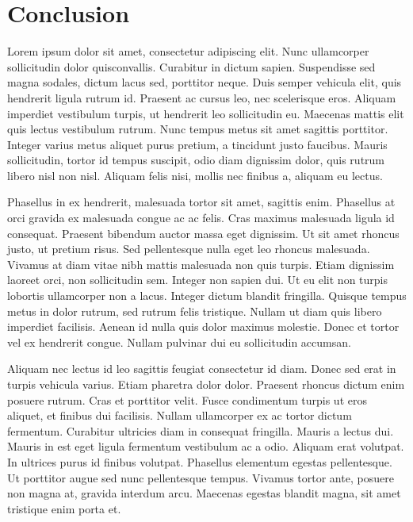 \chapter{Conclusion}

Lorem ipsum dolor sit amet, consectetur adipiscing elit. Nunc ullamcorper
sollicitudin dolor quisconvallis. Curabitur in dictum sapien. Suspendisse sed
magna sodales, dictum lacus sed, porttitor neque. Duis semper vehicula elit,
quis hendrerit ligula rutrum id. Praesent ac cursus leo, nec scelerisque eros.
Aliquam imperdiet vestibulum turpis, ut hendrerit leo sollicitudin eu. Maecenas
mattis elit quis lectus vestibulum rutrum. Nunc tempus metus sit amet sagittis
porttitor. Integer varius metus aliquet purus pretium, a tincidunt justo
faucibus. Mauris sollicitudin, tortor id tempus suscipit, odio diam dignissim
dolor, quis rutrum libero nisl non nisl. Aliquam felis nisi, mollis nec finibus
a, aliquam eu lectus.

Phasellus in ex hendrerit, malesuada tortor sit amet, sagittis enim. Phasellus
at orci gravida ex malesuada congue ac ac felis. Cras maximus malesuada ligula
id consequat. Praesent bibendum auctor massa eget dignissim. Ut sit amet rhoncus
justo, ut pretium risus. Sed pellentesque nulla eget leo rhoncus malesuada.
Vivamus at diam vitae nibh mattis malesuada non quis turpis. Etiam dignissim
laoreet orci, non sollicitudin sem. Integer non sapien dui. Ut eu elit non
turpis lobortis ullamcorper non a lacus. Integer dictum blandit fringilla.
Quisque tempus metus in dolor rutrum, sed rutrum felis tristique. Nullam ut diam
quis libero imperdiet facilisis. Aenean id nulla quis dolor maximus molestie.
Donec et tortor vel ex hendrerit congue. Nullam pulvinar dui eu sollicitudin
accumsan.

Aliquam nec lectus id leo sagittis feugiat consectetur id diam. Donec sed erat
in turpis vehicula varius. Etiam pharetra dolor dolor. Praesent rhoncus dictum
enim posuere rutrum. Cras et porttitor velit. Fusce condimentum turpis ut eros
aliquet, et finibus dui facilisis. Nullam ullamcorper ex ac tortor dictum
fermentum. Curabitur ultricies diam in consequat fringilla. Mauris a lectus dui.
Mauris in est eget ligula fermentum vestibulum ac a odio. Aliquam erat volutpat.
In ultrices purus id finibus volutpat. Phasellus elementum egestas pellentesque.
Ut porttitor augue sed nunc pellentesque tempus. Vivamus tortor ante, posuere
non magna at, gravida interdum arcu. Maecenas egestas blandit magna, sit amet
tristique enim porta et.
